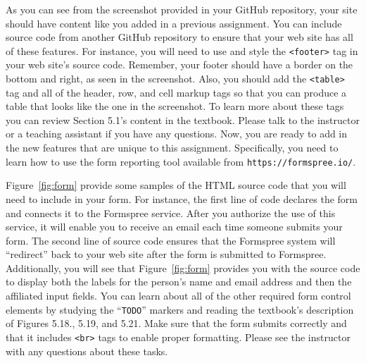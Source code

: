 \documentclass[11pt]{article}
\newcommand{\command}[1]{``\lstinline{#1}''}
\newcommand{\program}[1]{\lstinline{#1}}
\newcommand{\url}[1]{\lstinline{#1}}
\begin{document}
As you can see from the screenshot provided in your GitHub repository, your site
should have content like you added in a previous assignment. You can include
source code from another GitHub repository to ensure that your web site has all
of these features. For instance, you will need to use and style the
\program{<footer>} tag in your web site's source code. Remember, your footer
should have a border on the bottom and right, as seen in the screenshot. Also,
you should add the \program{<table>} tag and all of the header, row, and cell
markup tags so that you can produce a table that looks like the one in the
screenshot. To learn more about these tags you can review Section 5.1's content
in the textbook. Please talk to the instructor or a teaching assistant if you
have any questions. Now, you are ready to add in the new features that are
unique to this assignment. Specifically, you need to learn how to use the form
reporting tool available from \url{https://formspree.io/}.

Figure~\ref{fig:form} provide some samples of the HTML source code that you will
need to include in your form. For instance, the first line of code declares the
form and connects it to the Formspree service. After you authorize the use of
this service, it will enable you to receive an email each time someone submits
your form. The second line of source code ensures that the Formspree system will
``redirect'' back to your web site after the form is submitted to Formspree.
Additionally, you will see that Figure~\ref{fig:form} provides you with the
source code to display both the labels for the person's name and email address
and then the affiliated input fields. You can learn about all of the other
required form control elements by studying the \command{TODO} markers and
reading the textbook's description of Figures 5.18., 5.19, and 5.21. Make sure
that the form submits correctly and that it includes \program{<br>} tags to
enable proper formatting. Please see the instructor with any questions about
these tasks.

\end{document}
